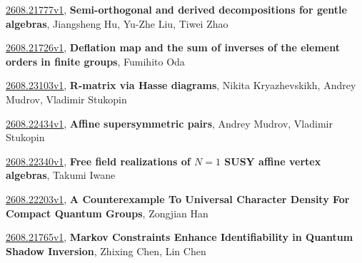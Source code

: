 \documentclass[9pt, a4paper]{article}
\theoremstyle{plain}
\theoremstyle{definition}
\theoremstyle{remark}
\newcommand{\arxiv}[3]{\href{https://arxiv.org/abs/#1}{#1}, \textbf{\textcolor{arxivblue}{#2}}, #3}
\begin{document}
\arxiv{2608.21777v1}{Semi-orthogonal and derived decompositions for gentle algebras}{Jiangsheng Hu, Yu-Zhe Liu, Tiwei Zhao}

\arxiv{2608.21726v1}{Deflation map and the sum of inverses of the element orders in finite groups}{Fumihito Oda}

\arxiv{2608.23103v1}{R-matrix via Hasse diagrams}{Nikita Kryazhevskikh, Andrey Mudrov, Vladimir Stukopin}

\arxiv{2608.22434v1}{Affine supersymmetric pairs}{Andrey Mudrov, Vladimir Stukopin}

\arxiv{2608.22340v1}{Free field realizations of $N=1$ SUSY affine vertex algebras}{Takumi Iwane}

\arxiv{2608.22203v1}{A Counterexample To Universal Character Density For Compact Quantum Groups}{Zongjian Han}

\arxiv{2608.21765v1}{Markov Constraints Enhance Identifiability in Quantum Shadow Inversion}{Zhixing Chen, Lin Chen}

\end{document}
